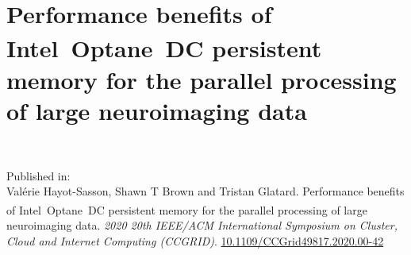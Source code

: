 \chapter{Performance benefits of
Intel\textsuperscript{\textregistered}~Optane\texttrademark~DC persistent memory
for the parallel processing of large neuroimaging data}~\label{chp:optane}


\noindent
Published in: \\
Val\'erie Hayot-Sasson, Shawn T Brown and Tristan Glatard. Performance benefits of
Intel\textsuperscript{\textregistered}~Optane\texttrademark~DC persistent memory
for the parallel processing of large neuroimaging data. \textit{2020 20th IEEE/ACM International Symposium on Cluster,
Cloud and Internet Computing (CCGRID)}. \url{10.1109/CCGrid49817.2020.00-42} \\


